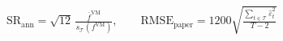 \documentclass[11pt,border=2pt]{standalone}
\begin{document}
{\color{mathblue}$\displaystyle \mathrm{SR}_{\mathrm{ann}}=\sqrt{12}\,\frac{\bar f^{\mathrm{VM}}}{s_{\mathcal T}(f^{\mathrm{VM}})},\qquad \mathrm{RMSE}_{\mathrm{paper}}=1200\sqrt{\frac{\sum_{t\in\mathcal T}\hat\varepsilon_t^2}{T-2}}$}
\end{document}
